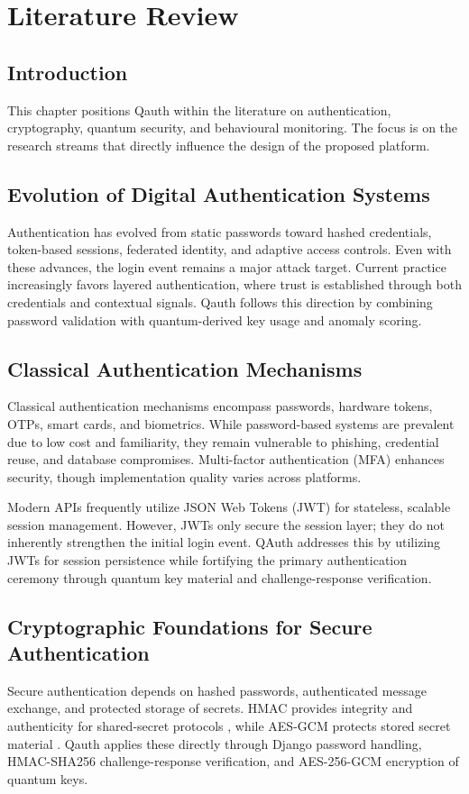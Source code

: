 \documentclass[12pt,a4paper]{report}
\begin{document}
\chapter{Literature Review}

\section{Introduction}
This chapter positions Qauth within the literature on authentication, cryptography, quantum security, and behavioural monitoring. The focus is on the research streams that directly influence the design of the proposed platform.

\section{Evolution of Digital Authentication Systems}
Authentication has evolved from static passwords toward hashed credentials, token-based sessions, federated identity, and adaptive access controls. Even with these advances, the login event remains a major attack target. Current practice increasingly favors layered authentication, where trust is established through both credentials and contextual signals. Qauth follows this direction by combining password validation with quantum-derived key usage and anomaly scoring.

\section{Classical Authentication Mechanisms}

Classical authentication mechanisms encompass passwords, hardware tokens, OTPs, smart cards, and biometrics. While password-based systems are prevalent due to low cost and familiarity, they remain vulnerable to phishing, credential reuse, and database compromises. Multi-factor authentication (MFA) enhances security, though implementation quality varies across platforms.

Modern APIs frequently utilize JSON Web Tokens (JWT) for stateless, scalable session management. However, JWTs only secure the session layer; they do not inherently strengthen the initial login event. QAuth addresses this by utilizing JWTs for session persistence while fortifying the primary authentication ceremony through quantum key material and challenge-response verification.

\section{Cryptographic Foundations for Secure Authentication}
Secure authentication depends on hashed passwords, authenticated message exchange, and protected storage of secrets. HMAC provides integrity and authenticity for shared-secret protocols \cite{rfc2104}, while AES-GCM protects stored secret material \cite{nistgcm}. Qauth applies these directly through Django password handling, HMAC-SHA256 challenge-response verification, and AES-256-GCM encryption of quantum keys.
\end{document}
